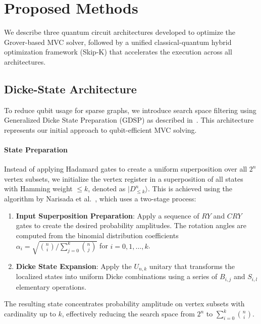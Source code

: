 \documentclass{ieeeaccess}
\begin{document}
\section{Proposed Methods}
\label{sec:methods}

We describe three quantum circuit architectures developed to
optimize the Grover-based MVC solver, followed by a unified
classical-quantum hybrid optimization framework (Skip-K) that
accelerates the execution across all architectures.

\subsection{Dicke-State Architecture}
\label{sec:dicke_state}

To reduce qubit usage for sparse graphs, we introduce search
space filtering using Generalized Dicke State Preparation
(GDSP) as described in~\cite{narisada_concrete_2023}.
This architecture represents our initial approach to
qubit-efficient MVC solving.

\paragraph{State Preparation}
Instead of applying Hadamard gates to create a uniform
superposition over all $2^n$ vertex subsets, we initialize
the vertex register in a superposition of all states with
Hamming weight $\leq k$, denoted as $|D_{\leq k}^n\rangle$.
This is achieved using the algorithm by Narisada et
al.~\cite{narisada_concrete_2023}, which uses a two-stage
process:

\begin{enumerate}
    \item \textbf{Input Superposition Preparation}: Apply a
    sequence of $RY$ and $CRY$ gates to create the desired
    probability amplitudes. The rotation angles are computed
    from the binomial distribution coefficients
    $\alpha_i = \sqrt{\binom{n}{i} / \sum_{j=0}^{k}\binom{n}{j}}$
    for $i = 0, 1, \ldots, k$.

    \item \textbf{Dicke State Expansion}: Apply the $U_{n,k}$
    unitary that transforms the localized states into uniform
    Dicke combinations using a series of $B_{i,j}$ and
    $S_{i,l}$ elementary operations.
\end{enumerate}

The resulting state concentrates probability amplitude on
vertex subsets with cardinality up to $k$, effectively
reducing the search space from $2^n$ to
$\sum_{i=0}^{k}\binom{n}{i}$.
\end{document}
